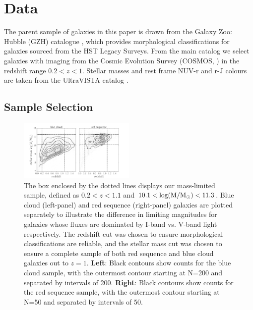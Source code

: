\documentclass[useAMS,usenatbib]{mn2e}
\begin{document}
\section{Data}
\label{sec:Data}

The parent sample of galaxies in this paper is drawn from the Galaxy Zoo: Hubble (GZH) catalogue \citep{Willett2016}, which provides morphological classifications for galaxies sourced from the HST Legacy Surveys. From the main catalog we select galaxies with imaging from the Cosmic Evolution Survey (COSMOS, \citet{Scoville2007}) in the redshift range $0.2<z<1$. Stellar masses and rest frame NUV-r and r-J colours are taken from the UltraVISTA catalog \citep{McCracken2012,Ilbert2013}.

\subsection{Sample Selection}
\label{sec:sampleselection}

\begin{figure}
\centering
\includegraphics[width=0.5\textwidth]{figures/mass_selection.pdf}
\caption{The box enclosed by the dotted lines displays our mass-limited sample, defined as $0.2<z<1.1$ and $10.1<\rm \log(M/M_{\odot})<11.3$. Blue cloud (left-panel) and red sequence (right-panel) galaxies are plotted separately to illustrate the difference in limiting magnitudes for galaxies whose fluxes are dominated by I-band vs. V-band light respectively. The redshift cut was chosen to ensure morphological classifications are reliable, and the stellar mass cut was chosen to ensure a complete sample of both red sequence and blue cloud galaxies out to $z=1$. \textbf{Left}: Black contours show counts for the blue cloud sample, with the outermost contour starting at N=200 and separated by intervals of 200. \textbf{Right}: Black contours show counts for the red sequence sample, with the outermost contour starting at N=50 and separated by intervals of 50. }
\label{masscut}
\end{figure}
\end{document}
